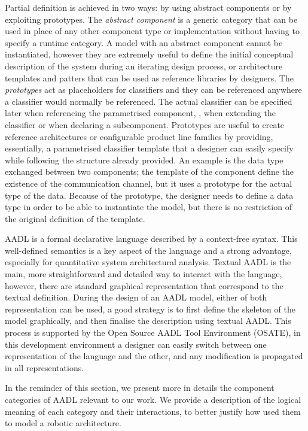 Partial definition is achieved in two ways: by using abstract components or by exploiting prototypes. The \textit{abstract component} is a generic category that can be used in place of any other component type or implementation without having to specify a runtime category. A model with an abstract component cannot be instantiated, however they are extremely useful to define the initial conceptual description of the system during an iterating design process, or architecture templates and patters that can be used as reference libraries by designers. The \textit{prototypes} act as placeholders for classifiers and they can be referenced anywhere a classifier would normally be referenced. The actual classifier can be specified later when referencing the parametrised component, \eg, when extending the classifier or when declaring a subcomponent. Prototypes are useful to create reference architectures or configurable product line families by providing, essentially, a parametrised classifier template that a designer can easily specify while following the structure already provided. An example is the data type exchanged between two components; the template of the component define the existence of the communication channel, but it uses a prototype for the actual type of the data. Because of the prototype, the designer needs to define a data type in order to be able to instantiate the model, but there is no restriction of the original definition of the template.

AADL is a formal declarative language described by a context-free syntax. This well-defined semantics is a key aspect of the language and a strong advantage, especially for quantitative system architectural analysis. Textual AADL is the main, more straightforward and detailed way to interact with the language, however, there are standard graphical representation that correspond to the textual definition. During the design of an AADL model, either of both representation can be used, a good strategy is to first define the skeleton of the model graphically, and then finalise the description using textual AADL. This process is supported by the Open Source AADL Tool Environment (OSATE), in this development environment a designer can easily switch between one representation of the language and the other, and any modification is propagated in all representations.

In the reminder of this section, we present more in details the component categories of AADL relevant to our work. We provide a description of the logical meaning of each category and their interactions, to better justify how used them to model a robotic architecture.

